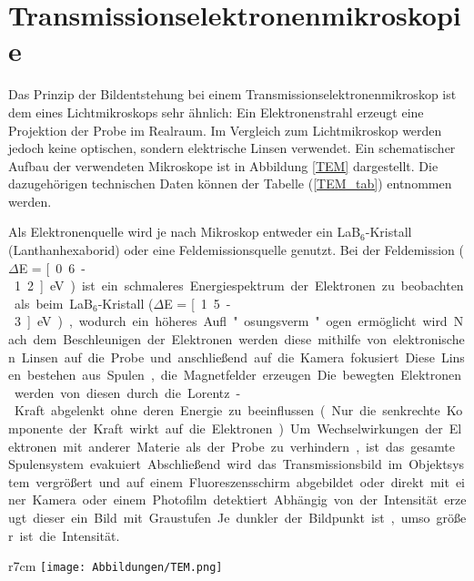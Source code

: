 \section{Transmissionselektronenmikroskopie} %
\label{sec:elektron_spektroskopie}

Das Prinzip der Bildentstehung bei einem Transmissionselektronenmikroskop ist dem eines Lichtmikroskops sehr ähnlich:
Ein Elektronenstrahl erzeugt eine Projektion der Probe im Realraum.
Im Vergleich zum Lichtmikroskop werden jedoch keine optischen, sondern elektrische Linsen verwendet.
Ein schematischer Aufbau der verwendeten Mikroskope ist in Abbildung \ref{TEM} dargestellt.
Die dazugehörigen technischen Daten können der Tabelle (\ref{TEM_tab}) entnommen werden.

Als Elektronenquelle wird je nach Mikroskop entweder ein LaB$_6$-Kris\-tall (Lanthanhexaborid) oder eine Feldemissionsquelle genutzt.
Bei der Feldemission ($\Delta$E = \unit[0.6-1.2]{eV}) ist ein schmaleres Energiespektrum der Elektronen zu beobachten als beim LaB$_6$-Kris\-tall ($\Delta$E = \unit[1.5-3]{eV}), wodurch ein höheres Aufl"osungsverm"ogen ermöglicht wird.
Nach dem Beschleunigen der Elektronen werden diese mithilfe von elektronischen Linsen auf die Probe und anschließend auf die Kamera fokusiert.
Diese Linsen bestehen aus Spulen, die Magnetfelder erzeugen.
Die bewegten Elektronen werden von diesen durch die Lorentz-Kraft abgelenkt ohne deren Energie zu beeinflussen (Nur die senkrechte Komponente der Kraft wirkt auf die Elektronen).
Um Wechselwirkungen der Elektronen mit anderer Materie als der Probe zu verhindern, ist das gesamte Spulensystem evakuiert.
Abschließend wird das Transmissionsbild im Objektsystem vergrößert und auf einem Fluoreszensschirm abgebildet oder direkt mit einer Kamera oder einem Photofilm detektiert.
Abhängig von der Intensität erzeugt dieser ein Bild mit Graustufen.
Je dunkler der Bildpunkt ist, umso größer ist die Intensität.

\begin{wrapfigure}{r}{7cm}
	\centering
	\texttt{[image: Abbildungen/TEM.png]}
	\caption[Schematische Aufbau eines Transmissionselektronenmikroskop]{Schematische Aufbau eines Transmissionselektronenmikroskop. (Entnommen aus Benutzerhandbuch JEOL Ldt.)}
	\label{TEM}
\end{wrapfigure}

